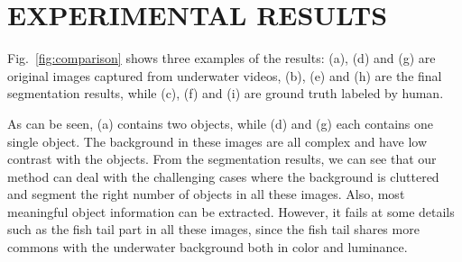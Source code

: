 \documentclass[conference]{IEEEtran}
\begin{document}
%



\section{EXPERIMENTAL RESULTS}

Fig.~\ref{fig:comparison} shows three examples of the results: (a), (d) and (g) are original images captured from underwater videos, (b), (e) and (h) are the final segmentation results, while (c), (f) and (i) are ground truth labeled by human. 

As can be seen, (a) contains two objects, while (d) and (g) each contains one single object. The background in these images are all complex and have low contrast with the objects. From the segmentation results, we can see that our method can deal with the challenging cases where the background is cluttered and segment the right number of objects in all these images. Also, most meaningful object information can be extracted. However, it fails at some details such as the fish tail part in all these images, since the fish tail shares more commons with the underwater background both in color and luminance.
\end{document}
